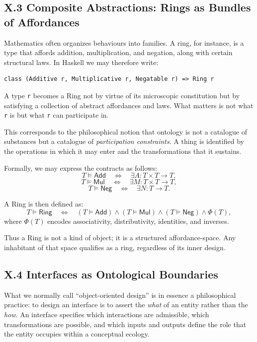 \documentclass[12pt,letterpaper]{article}
\begin{document}
\subsection{X.3 Composite Abstractions: Rings as Bundles of Affordances}

Mathematics often organizes behaviours into families. A ring, for instance, is a type that affords addition, multiplication, and negation, along with certain structural laws. In Haskell we may therefore write:

\begin{verbatim}
class (Additive r, Multiplicative r, Negatable r) => Ring r
\end{verbatim}

A type \texttt{r} becomes a Ring not by virtue of its microscopic constitution but by satisfying a collection of abstract affordances and laws. What matters is not what \texttt{r} is but what \texttt{r} can participate in.

This corresponds to the philosophical notion that ontology is not a catalogue of substances but a catalogue of \emph{participation constraints}. A thing is identified by the operations in which it may enter and the transformations that it sustains.

Formally, we may express the contracts as follows:
\[
T \vDash \mathsf{Add} \quad \iff \quad \exists A : T \times T \to T,
\]
\[
T \vDash \mathsf{Mul} \quad \iff \quad \exists M : T \times T \to T,
\]
\[
T \vDash \mathsf{Neg} \quad \iff \quad \exists N : T \to T.
\]

A Ring is then defined as:
\[
T \vDash \mathsf{Ring} \quad \iff \quad 
(T \vDash \mathsf{Add}) \land 
(T \vDash \mathsf{Mul}) \land
(T \vDash \mathsf{Neg}) \land \Phi(T),
\]
where \(\Phi(T)\) encodes associativity, distributivity, identities, and inverses.

Thus a Ring is not a kind of object; it is a structured affordance-space. Any inhabitant of that space qualifies as a ring, regardless of its inner design.

\subsection{X.4 Interfaces as Ontological Boundaries}

What we normally call ``object-oriented design'' is in essence a philosophical practice: to design an interface is to assert the \emph{what} of an entity rather than the \emph{how}. An interface specifies which interactions are admissible, which transformations are possible, and which inputs and outputs define the role that the entity occupies within a conceptual ecology.
\end{document}

